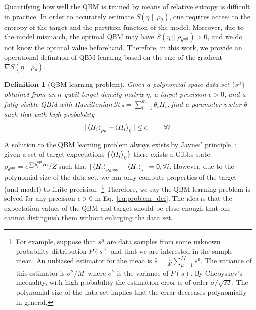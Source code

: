 \documentclass[
    aps,
    prx,
    floatfix,
    nofootinbib,
    onecolumn
]{revtex4-2}
\newtheorem{definition}{Definition}
\begin{document}
Quantifying how well the QBM is trained by means of relative entropy is difficult in practice. In order to accurately estimate $S(\eta\|\rho_\theta)$, one requires access to the entropy of the target and the partition function of the model. Moreover, due to the model mismatch, the optimal QBM may have $S(\eta \| \rho_{\theta^{\mathrm{opt}}})>0$, and we do not know the optimal value beforehand. Therefore, in this work, we provide an operational definition of QBM learning based on the size of the gradient $\nabla S(\eta \|\rho_\theta)$.

\begin{definition}[QBM learning problem]
\label{def:problem}
Given a polynomial-space data set $\{s^\mu\}$ obtained from an $n$-qubit target density matrix $\eta$, a target precision $\epsilon>0$, and a fully-visible QBM with Hamiltonian $\mathcal{H}_\theta =\sum_{i=1}^m \theta_i H_i$, find a parameter vector $\theta$ such that with high probability
\begin{equation}
\label{eq:problem_def}
    | \expval{H_i}_{\rho_{\theta}}  - \expval{H_i}_\eta | \leq \epsilon, \qquad \forall i .
\end{equation}
\end{definition}

A solution to the QBM learning problem always exists by Jaynes' principle~\cite{jaynes1957}: given a set of target expectations $\{ \expval{H_i}_\eta \}$ there exists a Gibbs state $\rho_{\theta^{\mathrm{opt}}} = e^{\sum \theta^{\mathrm{opt}}_i H_i}/Z$ such that $| \expval{H_i}_{\rho_{\theta^{\mathrm{opt}}}}  - \expval{H_i}_\eta |= 0, \forall i$. However, due to the polynomial size of the data set, we can only compute properties of the target (and model) to finite precision.~\footnote{For example, suppose that $s^\mu$ are data samples from some unknown probability distribution $P(s)$ and that we are interested in the sample mean. An unbiased estimator for the mean is $\hat{s} = \frac{1}{M}\sum_{\mu=1}^M s^\mu$. The variance of this estimator is $\sigma^2/M$, where $\sigma^2$ is the variance of $P(s)$. By Chebyshev's inequality, with high probability the estimation error is of order $\sigma/\sqrt{M}$. The polynomial size of the data set implies that the error decreases polynomially in general.} Therefore, we say the QBM learning problem is solved for any precision $\epsilon > 0$ in Eq.~\eqref{eq:problem_def}. The idea is that the expectation values of the QBM and target should be close enough that one cannot distinguish them without enlarging the data set.
\end{document}

